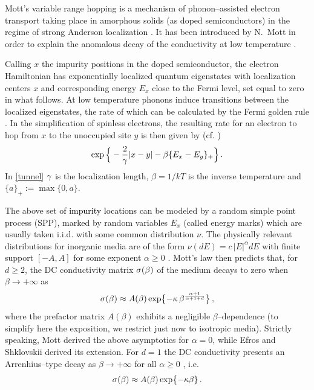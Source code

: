 \documentclass[12pt,a4paper,reqno]{amsart}
\let\a=\alpha \let\b=\beta   \let\d=\delta  \let\e=\varepsilon
\newcommand{\rosso}{\textcolor{black}} %
\newcommand{\be}{\begin{equation}}
\newcommand{\en}{\end{equation}}
\begin{document}
Mott's  variable range hopping is a mechanism of phonon--assisted electron transport taking place in amorphous solids (as doped semiconductors)  in the regime of strong Anderson localization \cite{AHL,MD,POF,Sa,SE}. It has been introduced by N.~Mott in order to explain the anomalous 
 decay of the conductivity  at low temperature \cite{Mott,Mott_Nob}.  
 
Calling $x$ the  impurity positions  in the doped semiconductor, the electron Hamiltonian has exponentially localized quantum eigenstates with localization centers $x$ and corresponding energy $E_{x}$  close to the Fermi level, set equal to zero in what follows. At low temperature phonons  induce transitions between the localized eigenstates, the rate of which can be calculated by the Fermi golden rule \cite{MA,SE}. In the simplification of spinless electrons,   the resulting rate for an electron to  hop from $x$ to the unoccupied site $y$ is then given by  (cf. \cite[Eq.~(3.6)]{AHL}) 
\be\label{tunnel} \exp\Big\{-\frac{2}{\g}  |x-y| - \beta \{ E_{x} -E_{y} \}_+\Big\} \,.\en
In \eqref{tunnel} $\gamma$ is the localization length, $\beta=1/k T $ is the inverse temperature and $\{a\}_+:= \max\{0,a\}$.


The above set \rosso{of impurity locations} can be modeled by a   random simple point process (SPP), marked by  random variables $E_x$ (called energy marks) which are usually taken i.i.d. with some common distribution $\nu$. The physically relevant distributions for inorganic media are of the form  $\nu(dE)= c\, |E|^{\alpha} dE$ with  finite support  $[-A,A]$  for some exponent $\a\geq 0$ \cite{SE}. Mott's law \cite{Mott,Mott_Nob,MD,SE} then  predicts  that, for $d\geq 2$,  the DC conductivity matrix $\s(\b)$ of the medium decays to zero when  $\b \to+ \infty$ as 
\be\label{mottino}
\s(\b) \approx  A(\b)\exp \bigl\{ -\k \, \beta ^\frac{\a+1}{\a+1+d}\bigr\}\,,
 \en
 where the prefactor matrix $A(\b)$ exhibits  a negligible $\b$--dependence (to simplify here the exposition, we restrict just now to isotropic media).
 Strictly speaking, Mott derived  the above asymptotics for $\a=0$, while  Efros and Shklovskii derived its extension. 
  For $d=1$ the DC conductivity presents an Arrenhius--type decay  as $\b \to+ \infty$  for all $\a\geq 0$ \cite{Kur}, i.e.\
 \be\label{mottino1}
 \s(\b)\approx  A(\b)\exp \bigl\{ -\k \b\}\,.
 \en
\end{document}
